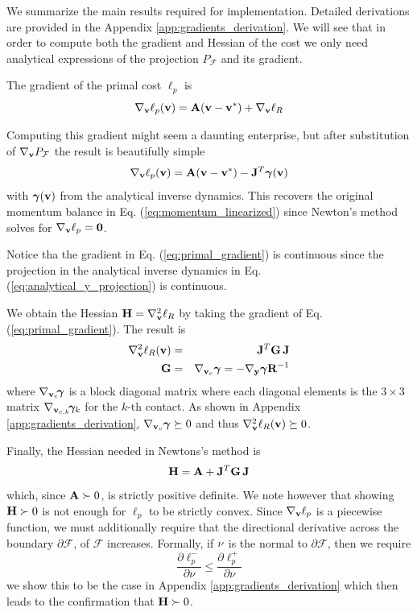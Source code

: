 We summarize the main results required for implementation. Detailed derivations
are provided in the Appendix \ref{app:gradients_derivation}. We will see that in
order to compute both the gradient and Hessian of the cost we only need
analytical expressions of the projection $P_\mathcal{F}$ and its gradient.

The gradient of the primal cost $\ell_p$ is
\begin{equation}
	\nabla_{\mathbf{v}}\ell_p({\mathbf{v}}) = {\mathbf{A}}({\mathbf{v}}-{\mathbf{v}}^*) + \nabla_{\mathbf{v}}\ell_R
\end{equation}

Computing this gradient might seem a daunting enterprise, but after substitution
of $\nabla_{\mathbf{v}}P_\mathcal{F}$ the result is beautifully simple
\begin{equation}
	\nabla_\mf{v}\ell_p(\mf{v}) = \mf{A}(\mf{v}-\mf{v}^*) - \mf{J}^T\bgamma(\mf{v})
	\label{eq:primal_gradient}
\end{equation}
with ${\bm\gamma}({\mathbf{v}})$ from the analytical inverse dynamics. This recovers the
original momentum balance in Eq. (\ref{eq:momentum_linearized}) since Newton's
method solves for $\nabla_{\mathbf{v}}\ell_p={\mathbf{0}}$.

Notice tha the gradient in Eq. (\ref{eq:primal_gradient}) is continuous since
the projection in the analytical inverse dynamics in Eq.
(\ref{eq:analytical_y_projection}) is continuous.

We obtain the Hessian ${\mathbf{H}}=\nabla_{\mathbf{v}}^2\ell_R$ by taking the gradient of
Eq. (\ref{eq:primal_gradient}). The result is
\begin{eqnarray}
	\nabla_\mf{v}^2\ell_R(\mf{v}) &=&
	\mf{J}^T\mf{G}\,\mf{J}\nonumber\\
	\mf{G} &=& \nabla_{\mf{v}_c}\bgamma = -\nabla_\mf{y}\bgamma \mf{R}^{-1}
	\label{eq:ellR_hessian}
\end{eqnarray}
where $\nabla_{{\mathbf{v}}_c}\!{\bm\gamma}$ is a block diagonal matrix where each
diagonal elements is the $3\times 3$ matrix
$\nabla_{{\mathbf{v}}_{c,k}}\!{\bm\gamma}_k$ for the $k\text{-th}$ contact. As shown in
Appendix \ref{app:gradients_derivation}, $\nabla_{{\mathbf{v}}_c}{\bm\gamma}\succeq 0$ and
thus $\nabla_{\mathbf{v}}^2\ell_R({\mathbf{v}})\succeq 0$.

Finally, the Hessian needed in Newtons's method is
\begin{equation}
	\mf{H}= \mf{A} + \mf{J}^T\mf{G}\,\mf{J}
	\label{eq:ell_hessian}
\end{equation}
which, since ${\mathbf{A}}\succ 0$, is strictly positive definite. We note however that
showing ${\mathbf{H}}\succ 0$ is not enough for $\ell_p$ to be
strictly convex. Since $\nabla_{\mathbf{v}}\ell_p$ is a piecewise function, we must
additionally require that the directional derivative across the boundary
$\partial\mathcal{F}$, of $\mathcal{F}$ increases. Formally, if ${\mathbf{\nu}}$ is
the normal to $\partial\mathcal{F}$, then we require
\begin{equation}
	\frac{\partial \ell_p^-}{\partial \nu} \le \frac{\partial \ell_p^+}{\partial \nu}
\end{equation}
we show this to be the case in Appendix \ref{app:gradients_derivation} which
then leads to the confirmation that ${\mathbf{H}}\succ 0$.

